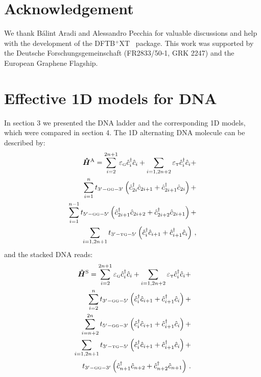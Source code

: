 \documentclass[reprint,superscriptaddress,nofootinbib,amsmath,amssymb,prb,floatfix]{revtex4-1}
\begin{document}
\section{Acknowledgement}

We thank B\'alint Aradi and Alessandro Pecchia for valuable discussions and help with the development of the
{\textsc{DFTB$^{\text{+}}$XT\ }} package. This work was supported by the Deutsche
Forschungsgemeinschaft (FR2833/50-1, GRK 2247) and the European Graphene Flagship.

%
%


\newpage
\appendix
\section{Effective 1D models for DNA}

In section 3 we presented the DNA ladder and the corresponding 1D models, which were compared in
section 4. The 1D alternating DNA molecule can be described by:
\begin{align}
 \boldsymbol{\hat{H}}^\text{A} = \sum_{i=2}^{2n+1} \varepsilon_\text{\tiny G} \hat{c}_i^\dagger  \hat{c}_i + 
		    \sum_{i=1, 2n+2} \varepsilon_\text{\tiny T} \hat{c}_i^\dagger \hat{c}_i + \notag \\ 
		    \sum_{i=1}^{n} t_{3'-\text{\tiny GG}-3'} \left(\hat{c}_{2i}^\dagger \hat{c}_{2i+1} + \hat{c}_{2i+1}^\dagger \hat{c}_{2i} \right) + \notag \\
		    \sum_{i=1}^{n-1} t_{5'-\text{\tiny GG}-5'} \left(\hat{c}_{2i+1}^\dagger \hat{c}_{2i+2} + \hat{c}_{2i+2}^\dagger \hat{c}_{2i+1}  \right) + \notag \\
		    \sum_{i=1,2n+1} t_{3'-\text{\tiny TG}-5'} \left(\hat{c}_{i}^\dagger \hat{c}_{i+1} + \hat{c}_{i+1}^\dagger \hat{c}_{i}  \right) \,,
\end{align}
and the stacked DNA reads:
\begin{align}
\boldsymbol{\hat{H}}^\text{S} = \sum_{i=2}^{2n+1} \varepsilon_\text{\tiny G} \hat{c}_i^\dagger  \hat{c}_i + 
		    \sum_{i=1, 2n+2} \varepsilon_\text{\tiny T} \hat{c}_i^\dagger \hat{c}_i + \notag \\
  		    \sum_{i=2}^{n} t_{3'-\text{\tiny GG}-5'} \left(\hat{c}_{i}^\dagger \hat{c}_{i+1} + \hat{c}_{i+1}^\dagger \hat{c}_{i} \right) + \notag \\
		    \sum_{i=n+2}^{2n} t_{5'-\text{\tiny GG}-3'} \left(\hat{c}_{i}^\dagger \hat{c}_{i+1} + \hat{c}_{i+1}^\dagger \hat{c}_{i} \right) + \notag \\
    		    \sum_{i=1,2n+1} t_{3'-\text{\tiny TG}-5'} \left(\hat{c}_{i}^\dagger \hat{c}_{i+1} + \hat{c}_{i+1}^\dagger \hat{c}_{i}  \right) + \notag \\
    		    t_{3'-\text{\tiny GG}-3'} \left(\hat{c}_{n+1}^\dagger \hat{c}_{n+2} + \hat{c}_{n+2}^\dagger \hat{c}_{n+1} \right) \,.
\end{align}
\end{document}
